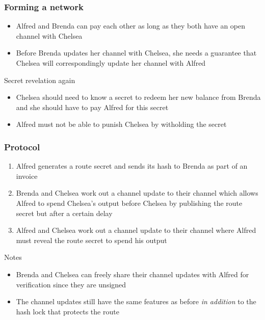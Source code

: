 \documentclass{beamer}
\begin{document}
\begin{frame}
	\frametitle{Forming a network}
	\begin{itemize}
		\item Alfred and Brenda can pay each other as long as they both have an 
			open channel with Chelsea \pause
		\item Before Brenda updates her channel with Chelsea, she needs a guarantee 
			that Chelsea will correspondingly update her channel with Alfred \pause
	\end{itemize}
	\begin{block}{Secret revelation again}
		\begin{itemize}
			\item Chelsea should need to know a secret to redeem her new balance from Brenda and 
				she should have to pay Alfred for this secret \pause
			\item Alfred must not be able to punish Chelsea by witholding the secret 
		\end{itemize}
	\end{block}
\end{frame}
\begin{frame}
	\frametitle{Protocol}
	\begin{enumerate}
		\item Alfred generates a route secret and sends its hash to Brenda as part of an invoice \pause
		\item Brenda and Chelsea work out a channel update to their channel which allows Alfred to 
			spend Chelsea's output before Chelsea by publishing the route secret but after a certain delay \pause
		\item Alfred and Chelsea work out a channel update to their channel where 
			Alfred must reveal the route secret to spend his output \pause
	\end{enumerate}
	\begin{block}{Notes}
		\begin{itemize}
			\item Brenda and Chelsea can freely share their channel updates with 
				Alfred for verification since they are unsigned	\pause
			\item The channel updates still have the same features as before \emph{in 
				addition} to the hash lock that protects the route 
		\end{itemize}
	\end{block}
\end{frame}
\end{document}
